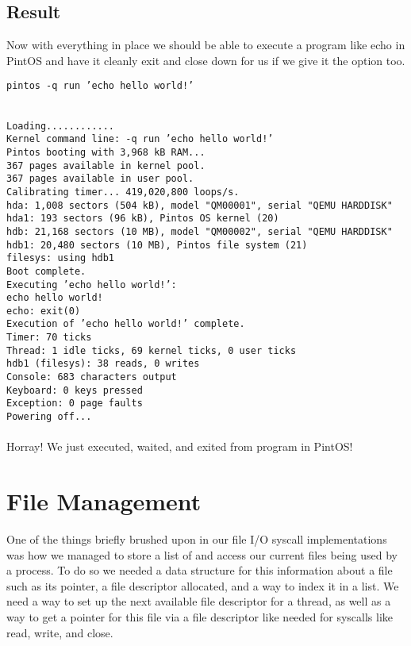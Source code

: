 \documentclass[]{article}
\begin{document}
 \subsection{Result}
 Now with everything in place we should be able to execute a program like echo in PintOS and have it cleanly exit and close down for us if we give it the option too.
 
 \centerline{\texttt{pintos -q run 'echo hello world!'}}
 \texttt{\\
Loading............\\
Kernel command line: -q run 'echo hello world!'\\
Pintos booting with 3,968 kB RAM...\\
367 pages available in kernel pool.\\
367 pages available in user pool.\\
Calibrating timer...  419,020,800 loops/s.\\
hda: 1,008 sectors (504 kB), model "QM00001", serial "QEMU HARDDISK"\\
hda1: 193 sectors (96 kB), Pintos OS kernel (20)\\
hdb: 21,168 sectors (10 MB), model "QM00002", serial "QEMU HARDDISK"\\
hdb1: 20,480 sectors (10 MB), Pintos file system (21)\\
filesys: using hdb1\\
Boot complete.\\
Executing 'echo hello world!':\\
echo hello world! \\
echo: exit(0)\\
Execution of 'echo hello world!' complete.\\
Timer: 70 ticks\\
Thread: 1 idle ticks, 69 kernel ticks, 0 user ticks\\
hdb1 (filesys): 38 reads, 0 writes\\
Console: 683 characters output\\
Keyboard: 0 keys pressed\\
Exception: 0 page faults\\
Powering off...\\
}
\\
Horray! We just executed, waited, and exited from program in PintOS!
\newpage
\section{File Management}
One of the things briefly brushed upon in our file I/O syscall implementations was how we managed to store a list of and access our current files being used by a process. To do so we needed a data structure for this information about a file such as its pointer, a file descriptor allocated, and a way to index it in a list. We need a way to set up the next available file descriptor for a thread, as well as a way to get a pointer for this file via a file descriptor like needed for syscalls like read, write, and close.
\end{document}
